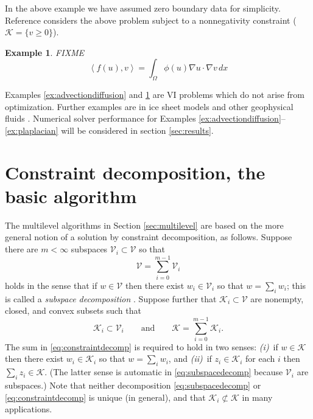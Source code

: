\documentclass[letterpaper,final,12pt,reqno]{amsart}
\theoremstyle{cstyle}
\theoremstyle{cstyle*}
\theoremstyle{dstyle}
\newtheorem{example}[theorem]{Example}
\numberwithin{equation}{section}
\numberwithin{figure}{section}
\numberwithin{table}{section}
\numberwithin{theorem}{section}
\newcommand{\grad}{\nabla}
\newcommand{\cK}{\mathcal{K}}
\newcommand{\cV}{\mathcal{V}}
\newcommand{\ip}[2]{\left<#1,#2\right>}
\begin{document}
In the above example we have assumed zero boundary data for simplicity.  Reference \cite{ChangNakshatrala2017} considers the above problem subject to a nonnegativity constraint ($\cK = \{v\ge 0\}$).

\begin{example}  \label{ex:porousgeneralization}  FIXME
\begin{equation}
\ip{f(u)}{v} = \int_\Omega \phi(u) \grad u \cdot \grad v\,dx \label{eq:porousgeneralization}
\end{equation}
\end{example}

Examples \ref{ex:advectiondiffusion} and \ref{ex:porousgeneralization} are VI problems which do not arise from optimization.  Further examples are in ice sheet models \cite{Calvoetal2002,JouvetBueler2012} and other geophysical fluids \cite{Bueler2021conservation}.  Numerical solver performance for Examples \ref{ex:advectiondiffusion}--\ref{ex:plaplacian} will be considered in section \ref{sec:results}.  %


\section{Constraint decomposition, the basic algorithm} \label{sec:cd}

The multilevel algorithms in Section \ref{sec:multilevel} are based on the more general notion of a solution by constraint decomposition, as follows.  Suppose there are $m<\infty$ subspaces $\cV_i \subset \cV$ so that
\begin{equation}
\cV = \sum_{i=0}^{m-1} \cV_i \label{eq:subspacedecomp}
\end{equation}
holds in the sense that if $w \in \cV$ then there exist $w_i \in \cV_i$ so that $w = \sum_i w_i$; this is called a \emph{subspace decomposition} \cite{Xu1992}.  Suppose further that $\cK_i \subset \cV$ are nonempty, closed, and convex subsets such that
\begin{equation}
\cK_i \subset \cV_i \qquad \text{and} \qquad \cK = \sum_{i=0}^{m-1} \cK_i. \label{eq:constraintdecomp}
\end{equation}
The sum in \eqref{eq:constraintdecomp} is required to hold in two senses: \emph{(i)}~if $w \in \cK$ then there exist $w_i \in \cK_i$ so that $w = \sum_i w_i$, and \emph{(ii)}~if $z_i \in \cK_i$ for each $i$ then $\sum_i z_i \in \cK$.  (The latter sense is automatic in \eqref{eq:subspacedecomp} because $\cV_i$ are subspaces.)  Note that neither decomposition \eqref{eq:subspacedecomp} or \eqref{eq:constraintdecomp} is unique (in general), and that $\cK_i \not\subset \cK$ in many applications.
\end{document}
